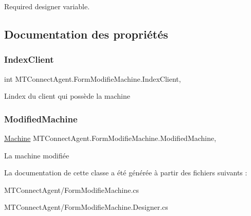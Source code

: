 Required designer variable. 



\subsection{Documentation des propriétés}
\mbox{\label{class_m_t_connect_agent_1_1_form_modifie_machine_a3f000e4c915524cf56e0ef077c1a9c96}} 
\subsubsection{\texorpdfstring{Index\+Client}{IndexClient}}
{\footnotesize\ttfamily int M\+T\+Connect\+Agent.\+Form\+Modifie\+Machine.\+Index\+Client\hspace{0.3cm}{\ttfamily [get]}, {\ttfamily [set]}}



L\textquotesingle{}index du client qui possède la machine 

\mbox{\label{class_m_t_connect_agent_1_1_form_modifie_machine_ad14ae74d3b5cd3987f6a9604514eb3c1}} 
\subsubsection{\texorpdfstring{Modified\+Machine}{ModifiedMachine}}
{\footnotesize\ttfamily \mbox{\hyperlink{class_m_t_connect_agent_1_1_model_1_1_machine}{Machine}} M\+T\+Connect\+Agent.\+Form\+Modifie\+Machine.\+Modified\+Machine\hspace{0.3cm}{\ttfamily [get]}, {\ttfamily [set]}}



La machine modifiée 



La documentation de cette classe a été générée à partir des fichiers suivants \+:\begin{DoxyCompactItemize}
\item 
M\+T\+Connect\+Agent/Form\+Modifie\+Machine.\+cs\item 
M\+T\+Connect\+Agent/Form\+Modifie\+Machine.\+Designer.\+cs\end{DoxyCompactItemize}
